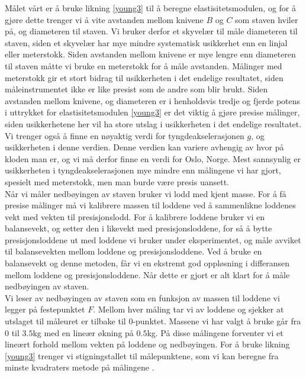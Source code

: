 \documentclass[%
 reprint,
 amsmath,amssymb,
 aps,
 norsk,
 booktabs
]{revtex4-1}
\begin{document}
Målet vårt er å bruke likning \eqref{young3} til å beregne elastisitetsmodulen, og for å gjøre dette trenger vi å vite avstanden mellom knivene $B$ og $C$ som staven hviler på, og diameteren til staven. Vi bruker derfor et skyvelær til måle diameteren til staven, siden et skyvelær har mye mindre systematisk usikkerhet enn en linjal eller meterstokk. Siden avstanden mellom knivene er mye lengre enn diameteren til staven måtte vi bruke en meterstokk for å måle avstanden. Målinger med meterstokk gir et stort bidrag til usikkerheten i det endelige resultatet, siden måleinstrumentet ikke er like presist som de andre som blir brukt. Siden avstanden mellom knivene, og diameteren er i henholdsvis tredje og fjerde potens i uttrykket for elastisitetsmodulen \eqref{young3} er det viktig å gjøre presise målinger, siden usikkerhetene her vil ha store utslag i usikkerheten i det endelige resultatet. Vi trenger også å finne en nøyaktig verdi for tyngdeakselerasjonen $g$, og usikkerheten i denne verdien. Denne verdien kan variere avhengig av hvor på kloden man er, og vi må derfor finne en verdi for Oslo, Norge. Mest sannsynlig er usikkerheten i tyngdeakselerasjonen mye mindre enn målingene vi har gjort, spesielt med meterstokk, men man burde være  presis uansett.\\
Når vi måler nedbøyingen av staven bruker vi lodd med kjent masse. For å få presise målinger må vi kalibrere massen til loddene ved å sammenlikne loddenes vekt med vekten til presisjonslodd. For å kalibrere loddene bruker vi en balansevekt, og setter den i likevekt med presisjonsloddene, for så å bytte presisjonsloddene ut med loddene vi bruker under eksperimentet, og måle avviket til balansevekten mellom loddene og presisjonsloddene. Ved å bruke en balansevekt og denne metoden, får vi en ekstremt god oppløsning i differansen mellom loddene og presisjonsloddene. Når dette er gjort er alt klart for å måle nedbøyingen av staven.\\
Vi leser av nedbøyingen av staven som en funksjon av massen til loddene vi legger på festepunktet $F$. Mellom hver måling tar vi av loddene og sjekker at utslaget til måleuret er tilbake til $0$-punktet. Massene vi har valgt å bruke går fra $0$ til $3.5$kg med en lineær økning på $0.5$kg. På disse målingene forventer vi et lineært forhold mellom vekten på loddene og nedbøyingen. For å bruke likning \eqref{young3} trenger vi stigningstallet til målepunktene, som vi kan beregne fra minste kvadraters metode på målingene \cite{squires}. \\
\end{document}
